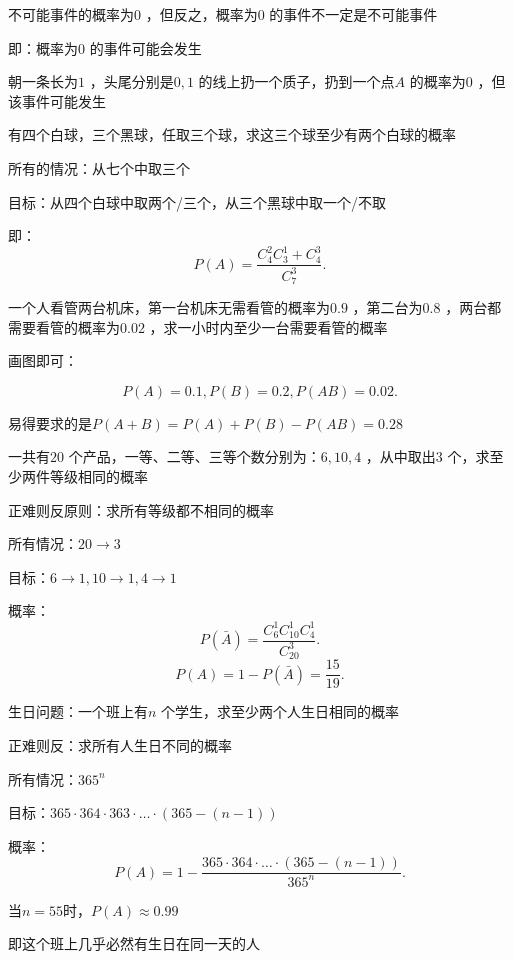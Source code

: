\begin{notation}
    不可能事件的概率为$0$ ，但反之，概率为$0$ 的事件不一定是不可能事件

    即：概率为$0$ 的事件可能会发生
\end{notation}
\begin{eg}
    朝一条长为$1$ ，头尾分别是$0,1$ 的线上扔一个质子，扔到一个点$A$ 的概率为$0$ ，但该事件可能发生
\end{eg}
\begin{eg}
    有四个白球，三个黑球，任取三个球，求这三个球至少有两个白球的概率

    所有的情况：从七个中取三个

    目标：从四个白球中取两个/三个，从三个黑球中取一个/不取

    即：\[
        P\left( A \right) =\frac{C_{4}^{2}C_{3}^{1}+C_{4}^{3}}{C_{7}^{3}}
    .\] 
\end{eg}
\begin{eg}
    一个人看管两台机床，第一台机床无需看管的概率为$0.9$ ，第二台为$0.8$ ，两台都需要看管的概率为$0.02$ ，求一小时内至少一台需要看管的概率

    画图即可：
    \begin{center}
    \end{center}
    \[
        P\left( A \right) =0.1,P\left( B \right) =0.2,P\left( AB \right) =0.02
    .\] 
    
    易得要求的是$P\left( A+B \right) =P\left( A \right) +P\left( B \right) -P\left( AB \right) =0.28$
\end{eg}
\begin{eg}
    一共有$20$ 个产品，一等、二等、三等个数分别为：$6,10,4$ ，从中取出$3$ 个，求至少两件等级相同的概率

    正难则反原则：求所有等级都不相同的概率

    所有情况：$20\to 3$

    目标：$6\to 1,10\to 1,4\to 1$ 

    概率：
     \[
        P\left( \bar{A} \right) =\frac{C_{6}^{1}C_{10}^{1}C_{4}^{1}}{C_{20}^{3}}
    .\] 
     \[
        P\left( A \right) =1-P\left( \bar{A} \right) =\frac{15}{19}
    .\] 

\end{eg}
\begin{eg}
    生日问题：一个班上有$n$ 个学生，求至少两个人生日相同的概率

    正难则反：求所有人生日不同的概率

    所有情况：$365^n$ 

    目标：$365\cdot 364\cdot 363\cdot \ldots\cdot (365-\left( n-1 \right)) $ 

    概率：\[
        P\left( A \right) =1-\frac{365\cdot 364\cdot \ldots\cdot (365-\left( n-1 \right)) }{365^{n}}
    .\]

    当$n=55$时，$P\left( A \right) \approx 0.99$

    即这个班上几乎必然有生日在同一天的人
\end{eg}
